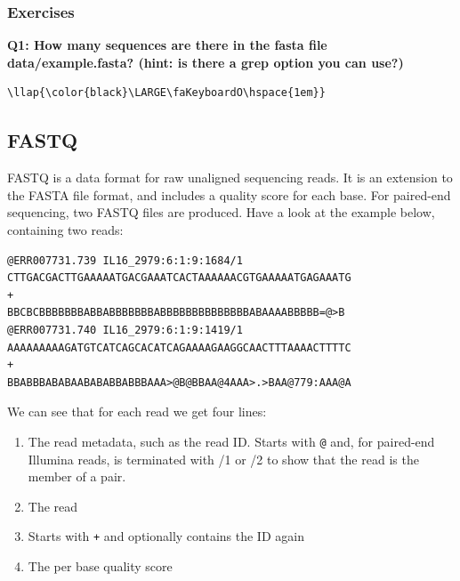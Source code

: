 \documentclass[11pt]{article}
\providecommand{\tightlist}{%
      \setlength{\itemsep}{0pt}\setlength{\parskip}{0pt}}
\begin{document}
\hypertarget{exercises}{%
\subsubsection{Exercises}\label{exercises}}

\textbf{Q1: How many sequences are there in the fasta file
data/example.fasta? (hint: is there a grep option you can use?)}

\begin{terminalinput}
\begin{Verbatim}[commandchars=\\\{\}]
\llap{\color{black}\LARGE\faKeyboardO\hspace{1em}}
\end{Verbatim}
\end{terminalinput}

    \hypertarget{fastq}{%
\subsection{FASTQ}\label{fastq}}

FASTQ is a data format for raw unaligned sequencing reads. It is an
extension to the FASTA file format, and includes a quality score for
each base. For paired-end sequencing, two FASTQ files are produced. Have
a look at the example below, containing two reads:

\begin{verbatim}
@ERR007731.739 IL16_2979:6:1:9:1684/1
CTTGACGACTTGAAAAATGACGAAATCACTAAAAAACGTGAAAAATGAGAAATG
+
BBCBCBBBBBBBABBABBBBBBBABBBBBBBBBBBBBBABAAAABBBBB=@>B
@ERR007731.740 IL16_2979:6:1:9:1419/1
AAAAAAAAAGATGTCATCAGCACATCAGAAAAGAAGGCAACTTTAAAACTTTTC
+
BBABBBABABAABABABBABBBAAA>@B@BBAA@4AAA>.>BAA@779:AAA@A
\end{verbatim}



\newpage




We can see that for each read we get four lines:

\begin{enumerate}
\def\labelenumi{\arabic{enumi}.}
\tightlist
\item
  The read metadata, such as the read ID. Starts with \texttt{@} and,
  for paired-end Illumina reads, is terminated with /1 or /2 to show
  that the read is the member of a pair.
\item
  The read
\item
  Starts with \texttt{+} and optionally contains the ID again
\item
  The per base quality score
\end{enumerate}
\end{document}
